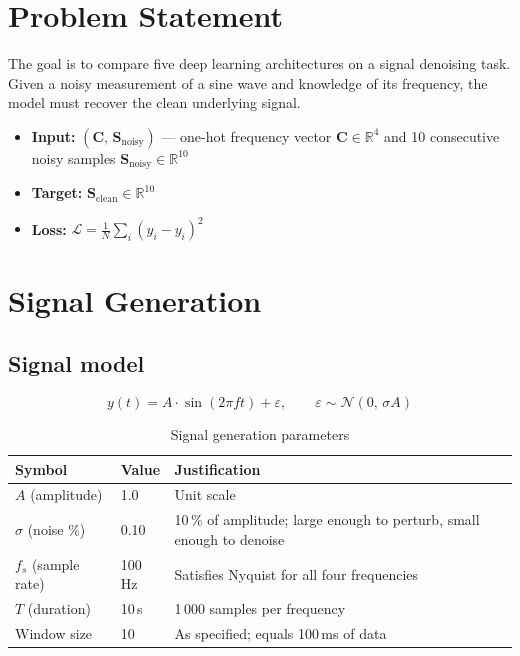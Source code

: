 \documentclass[12pt, a4paper]{article}
\begin{document}
\newpage

\section{Problem Statement}

The goal is to compare five deep learning architectures on a signal
denoising task.
Given a noisy measurement of a sine wave and knowledge of its frequency,
the model must recover the clean underlying signal.

\begin{itemize}[noitemsep]
    \item \textbf{Input:} $(\mathbf{C},\, \mathbf{S}_{\text{noisy}})$ — one-hot
          frequency vector $\mathbf{C} \in \mathbb{R}^{4}$ and 10 consecutive
          noisy samples $\mathbf{S}_{\text{noisy}} \in \mathbb{R}^{10}$
    \item \textbf{Target:} $\mathbf{S}_{\text{clean}} \in \mathbb{R}^{10}$
    \item \textbf{Loss:} $\mathcal{L} = \frac{1}{N}\sum_{i}(\hat{y}_i - y_i)^2$
\end{itemize}

\section{Signal Generation}

\subsection{Signal model}

\begin{equation}
    y(t) = A \cdot \sin(2\pi f t) + \varepsilon,
    \qquad \varepsilon \sim \mathcal{N}(0,\,\sigma A)
\end{equation}

\begin{table}[H]
\centering
\caption{Signal generation parameters}
\label{tab:params}
\begin{tabular}{lll}
\toprule
\textbf{Symbol} & \textbf{Value} & \textbf{Justification} \\
\midrule
$A$ (amplitude)       & 1.0     & Unit scale \\
$\sigma$ (noise \%)   & 0.10    & 10\,\% of amplitude; large enough to perturb, small enough to denoise \\
$f_s$ (sample rate)   & 100\,Hz & Satisfies Nyquist for all four frequencies \\
$T$ (duration)        & 10\,s   & 1\,000 samples per frequency \\
Window size           & 10      & As specified; equals 100\,ms of data \\
\bottomrule
\end{tabular}
\end{table}
\end{document}
